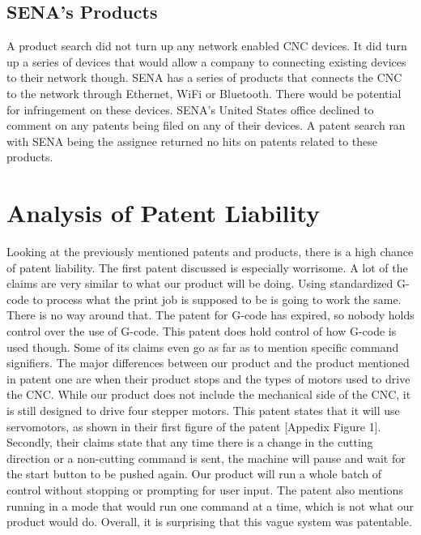 \subsection{SENA’s Products}

A product search did not turn up any network enabled CNC devices.  
It did turn up a series of devices that would allow a company to connecting existing devices to their network though. 
SENA has a series of products that connects the CNC to the network through Ethernet, WiFi or Bluetooth. 
There would be potential for infringement on these devices. 
SENA’s United States office declined to comment on any patents being filed on any of their devices. 
A patent search ran with SENA being the assignee returned no hits on patents related to these products.


\section{Analysis of Patent Liability}


Looking at the previously mentioned patents and products, there is a high chance of patent liability.  
The first patent discussed is especially worrisome. 
A lot of the claims are very similar to what our product will be doing. 
Using standardized G-code to process what the print job is supposed to be is going to work the same. 
There is no way around that. 
The patent for G-code has expired, so nobody holds control over the use of G-code. 
This patent does hold control of how G-code is used though.  
Some of its claims even go as far as to mention specific command signifiers. 
The major differences between our product and the product mentioned in patent one are when their product stops and the types of motors used to drive the CNC. 
While our product does not include the mechanical side of the CNC, it is still designed to drive four stepper motors. 
This patent states that it will use servomotors, as shown in their first figure of the patent [Appedix Figure 1]. 
Secondly, their claims state that any time there is a change in the cutting direction or a non-cutting command is sent, the machine will pause and wait for the start button to be pushed again. 
Our product will run a whole batch of control without stopping or prompting for user input. 
The patent also mentions running in a mode that would run one command at a time, which is not what our product would do.
Overall, it is surprising that this vague system was patentable.


